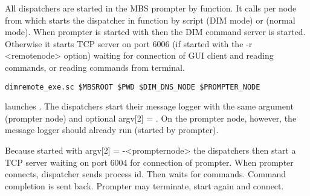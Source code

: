 All dispatchers are started in the MBS prompter by  function. It calls per node from  which starts the dispatcher in function  by script  (DIM mode) or  (normal mode).
When prompter is started with  then the DIM command server is started. Otherwise it starts TCP server on port 6006 (if started with the -r <remotenode> option) waiting for connection of GUI client and reading commands, or reading commands from terminal.
\begin{verbatim}
dimremote_exe.sc $MBSROOT $PWD $DIM_DNS_NODE $PROMPTER_NODE 
\end{verbatim}
launches . 
The dispatchers start their message logger with the same argument (prompter node) and 
optional argv[2] = . On the prompter node, however, the message logger should already run (started by prompter).

Because started with argv[2] = -<prompternode> the dispatchers then start a TCP server waiting on port 6004 for connection of prompter. When prompter connects, dispatcher sends process id. Then waits for commands. Command completion is sent back. Prompter may terminate, start again and connect.

